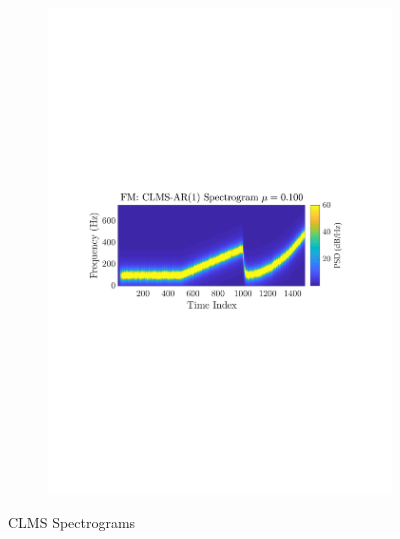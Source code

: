 \documentclass[12pt]{article}
\numberwithin{equation}{section}
\begin{document}
\begin{figure}[H]
\begin{subfigure}{0.49\textwidth}
					\includegraphics[trim={2.2cm 11.2cm 3.00cm  11.2cm}, clip, width=\textwidth]{../MATLAB/figures/q3_2b_fig04.pdf} 
					\captionsetup{justification=centering}
				\end{subfigure}
				
				\captionsetup{justification=centering}
				\caption{CLMS Spectrograms}
				\label{fig: 3-2b}
			\end{figure}
		
\end{document}
